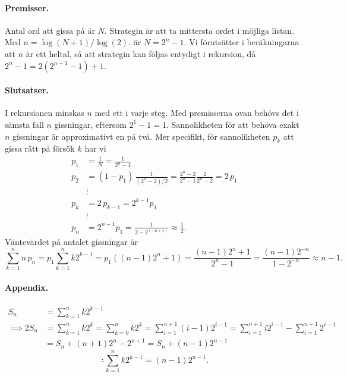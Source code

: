 \documentclass{article}
\begin{document}
\paragraph{Premisser.}
Antal ord att gissa på är $N$.
Strategin är att ta mittersta ordet i möjliga listan.
Med 
$n = \log(N+1)/\log(2)$.
är
$N=2^n-1$.
Vi förutsätter i beräkningarna att $n$ är ett heltal, så att strategin kan följas entydigt i rekursion, då $2^n-1=2(2^{n-1}-1)+1$.

\paragraph{Slutsatser.}
I rekursionen minskas $n$ med ett i varje steg.
Med premisserna ovan behövs det i sämsta fall $n$ gissningar, eftersom $2^{1}-1=1$.
Sannolikheten för att behöva exakt $n$ gissningar är approximativt en på två. Mer specifikt, för sannolikheten $p_k$ att gissa rätt på försök $k$ har vi
\begin{align*}
p_1 &= \frac{1}{N} = \frac{1}{2^n-1} \\
p_2 &= (1-p_1)\, \frac{1}{(2^n-2)/2} = \frac{2^n-2}{2^n-1}\frac{2}{2^n-2} = 2\,p_1 \\
&\vdots \\
p_k &= 2\,p_{k-1} = 2^{k-1}p_1 \\
&\vdots \\
p_n &= 2^{n-1}p_1 = \frac{1}{2-2^(-n+1)} \approx \frac{1}{2}.
\end{align*}
Väntevärdet på antalet gissningar är
\[
\sum_{k=1}^n n\,p_n 
=
p_1\sum_{k=1}^n k 2^{k-1} = p_1\left((n-1)2^n+1\right)
= 
\frac{(n-1)2^n+1}{2^n-1}
=
\frac{(n-1)2^{-n}}{1-2^{-n}}\approx n-1.
\]




\paragraph{Appendix.}
\[\begin{split}
S_n&=\sum_{k=1}^{n}k 2^{k-1}\\
\implies
2S_n &= \sum_{k=1}^{n}k 2^{k}
= \sum_{k=0}^{n}k 2^{k}
= \sum_{i=1}^{n+1} (i-1) 2^{i-1}
= \sum_{i=1}^{n+1} i 2^{i-1} 
- \sum_{i=1}^{n+1} 2^{i-1}
\\&= S_n + (n+1)2^{n} - 2^{n+1}
= S_n + (n-1)2^{n-1}
\end{split}\]
\[\therefore \sum_{k=1}^{n}k 2^{k-1} = (n-1)2^{n-1}.\]
\end{document}
